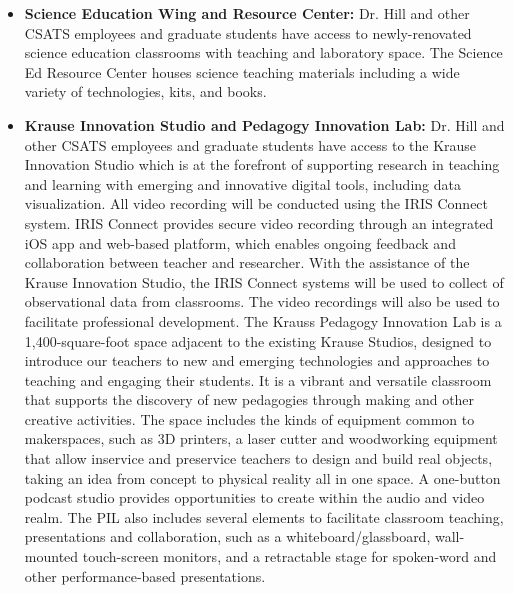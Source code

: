 \documentclass[11pt]{article}
\begin{document}
\begin{itemize}
\begin{itemize}[noitemsep]
        \item \textbf{Science Education Wing and Resource Center: } Dr. Hill and other CSATS employees and graduate students have access to newly-renovated science education classrooms with teaching and laboratory space. The Science Ed Resource Center houses science teaching materials including a wide variety of technologies, kits, and books.

        \item \textbf{Krause Innovation Studio and Pedagogy Innovation Lab:} Dr. Hill and other CSATS employees and graduate students have access to the Krause Innovation Studio which is at the forefront of supporting research in teaching and learning with emerging and innovative digital tools, including data visualization. All video recording will be conducted using the IRIS Connect system. IRIS Connect provides secure video recording through an integrated iOS app and web-based platform, which enables ongoing feedback and collaboration between teacher and researcher. With the assistance of the Krause Innovation Studio, the IRIS Connect systems will be used to collect of observational data from classrooms. The video recordings will also be used to facilitate professional development. The Krauss Pedagogy Innovation Lab is a 1,400-square-foot space adjacent to the existing Krause Studios, designed to introduce our teachers to new and emerging technologies and approaches to teaching and engaging their students. It is a vibrant and versatile classroom that supports the discovery of new pedagogies through making and other creative activities. The space includes the kinds of equipment common to makerspaces, such as 3D printers, a laser cutter and woodworking equipment that allow inservice and preservice teachers to design and build real objects, taking an idea from concept to physical reality all in one space. A one-button podcast studio provides opportunities to create within the audio and video realm. The PIL also includes several elements to facilitate classroom teaching, presentations and collaboration, such as a whiteboard/glassboard, wall-mounted touch-screen monitors, and a retractable stage for spoken-word and other performance-based presentations.
 
    \end{itemize}


\end{itemize}
\end{document}
